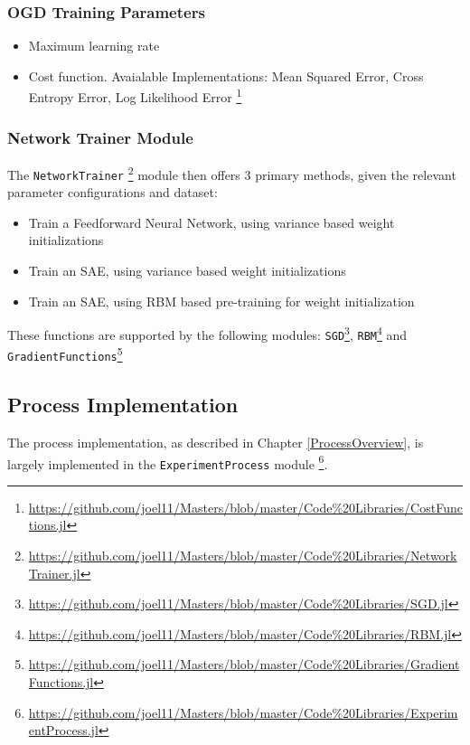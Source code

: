 \documentclass[a4paper,11pt,oneside]{article}
\theoremstyle{plain}
\theoremstyle{definition}
\begin{document}
	\subsubsection{OGD Training Parameters}
	\begin{itemize}
		\item[1] Maximum learning rate
		\item[2] Cost function. Avaialable Implementations: Mean Squared Error, Cross Entropy Error, Log Likelihood Error \footnote{\url{https://github.com/joel11/Masters/blob/master/Code\%20Libraries/CostFunctions.jl}}
	\end{itemize}	
	
	\subsubsection{Network Trainer Module}
	
	The \texttt{NetworkTrainer} \footnote{\url{https://github.com/joel11/Masters/blob/master/Code\%20Libraries/NetworkTrainer.jl}} module then offers 3 primary methods, given the relevant parameter configurations and dataset:
	
	\begin{itemize}
		\item[1] Train a Feedforward Neural Network, using variance based weight initializations 
		\item[2] Train an SAE, using variance based weight initializations
		\item[3] Train an SAE, using RBM based pre-training for weight initialization
	\end{itemize}
	
	These functions are supported by the following modules: \texttt{SGD}\footnote{\url{https://github.com/joel11/Masters/blob/master/Code\%20Libraries/SGD.jl}}, \texttt{RBM}\footnote{\url{https://github.com/joel11/Masters/blob/master/Code\%20Libraries/RBM.jl}} and \newline  \texttt{GradientFunctions}\footnote{\url{https://github.com/joel11/Masters/blob/master/Code\%20Libraries/GradientFunctions.jl}}
	
	\subsection{Process Implementation}
	
	The process implementation, as described in Chapter \ref{ProcessOverview}, is largely implemented in the \texttt{ExperimentProcess} module \footnote{\url{https://github.com/joel11/Masters/blob/master/Code\%20Libraries/ExperimentProcess.jl}}.
	
\end{document}
